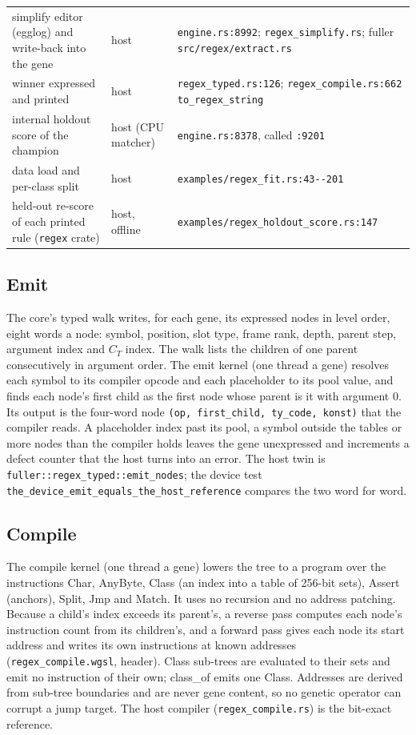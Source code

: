 \documentclass[sigconf,nonacm]{acmart}
\newcommand{\sym}[1]{\textsf{#1}}
\newcommand{\src}[1]{{\small\nolinkurl{#1}}}
\begin{document}
\begin{table}[t]
\begin{tabular}{@{}p{}p{}p{}@{}}
simplify editor (egglog) and write-back into the gene & host & \texttt{engine.rs:8992}; \src{regex_simplify.rs}; fuller \texttt{src/regex/extract.rs} \\
winner expressed and printed & host & \src{regex_typed.rs:126}; \src{regex_compile.rs:662} \src{to_regex_string} \\
internal holdout score of the champion & host (CPU matcher) & \texttt{engine.rs:8378}, called \texttt{:9201} \\
data load and per-class split & host & \src{examples/regex_fit.rs:43--201} \\
held-out re-score of each printed rule (\texttt{regex} crate) & host, offline & \src{examples/regex_holdout_score.rs:147} \\
\bottomrule
\end{tabular}
\end{table}

\subsection{Emit}

The core's typed walk writes, for each gene, its expressed nodes in level order,
eight words a node: symbol, position, slot type, frame rank, depth, parent step,
argument index and $C_T$ index. The walk lists the children of one parent
consecutively in argument order. The emit kernel (one thread a gene) resolves
each symbol to its compiler opcode and each placeholder to its pool value, and
finds each node's first child as the first node whose parent is it with argument
0. Its output is the four-word node \texttt{(op, first\_child, ty\_code, konst)}
that the compiler reads. A placeholder index past its pool, a symbol outside the
tables or more nodes than the compiler holds leaves the gene unexpressed and
increments a defect counter that the host turns into an error. The host twin is
\src{fuller::regex_typed::emit_nodes}; the device test
\src{the_device_emit_equals_the_host_reference} compares the two word for
word.

\subsection{Compile}

The compile kernel (one thread a gene) lowers the tree to a program over the
instructions \textsf{Char}, \textsf{AnyByte}, \textsf{Class} (an index into a
table of 256-bit sets), \textsf{Assert} (anchors), \textsf{Split}, \textsf{Jmp}
and \textsf{Match}. It uses no recursion and no address patching. Because a
child's index exceeds its parent's, a reverse pass computes each node's
instruction count from its children's, and a forward pass gives each node its
start address and writes its own instructions at known addresses
(\src{regex_compile.wgsl}, header). Class sub-trees are evaluated to their sets
and emit no instruction of their own; \sym{class\_of} emits one \textsf{Class}.
Addresses are derived from sub-tree boundaries and are never gene content, so no
genetic operator can corrupt a jump target. The host compiler
(\src{regex_compile.rs}) is the bit-exact reference.
\end{document}
